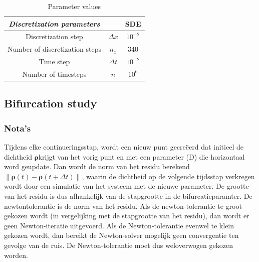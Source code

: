 \documentclass[]{article}
\newcommand{\norm}[1]{\left\|#1\right\|} %
\newcommand{\U}{\ensuremath{\boldsymbol{\rho}}}
\theoremstyle{definition}
\begin{document}
 \begin{center}
\begin{table}
\caption{Parameter values}
  \begin{tabular} { | c  c | c |}    \hline   
   \textit{ {Discretization parameters}}&    &  SDE    \\ \hline
    Discretization step  & $\Delta x $  & $10^{-2}$ \\ 
        Number of discretization steps  & $n_x$ &  340 \\ 
    Time step  &  $\Delta t$ &   $10^{-2}$ \\ 
       Number of timesteps  & $n$  &  $10^{6}$ \\ \hline
  \end{tabular}
\end{table}
\end{center}

\subsection{Bifurcation study}



\subsubsection{Nota's}
Tijdens elke continueringsstap, wordt een nieuw punt gecreëerd dat initieel de dichtheid \U krijgt van het vorig punt en met een parameter (D) die horizontaal word geupdate. Dan wordt de norm van het residu berekend $\norm{ \U(t) - \U(t+\Delta t)} $, waarin de dichtheid op de volgende tijdsstap verkregen wordt door een simulatie van het systeem met de nieuwe parameter. De grootte van het residu is dus afhankelijk van de stapgrootte in de bifurcatieparamter. De newtontolerantie is de norm van het residu. Als de newton-tolerantie te groot gekozen wordt (in vergelijking met de stapgrootte van het residu), dan wordt er geen Newton-iteratie uitgevoerd. Als de Newton-tolerantie evenwel te klein gekozen wordt, dan bereikt de Newton-solver mogelijk geen convergentie ten gevolge van de ruis. De Newton-tolerantie moet dus weloverwogen gekozen worden. 
\end{document}
